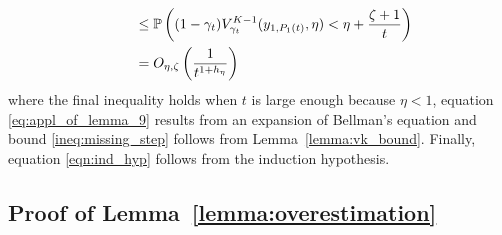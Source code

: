 \begin{myproof}[Proof.]
\begin{align}
	& \qquad \le \mathbb{P} \left(  (1-\gamma_t)V^{K-1}_{\gamma_{t}}(y_{1,P_{1}(t)}, \eta)< \eta +   \frac{\zeta + 1}{t} \right) \nonumber \\
	&\qquad =  O_{\eta,\zeta}\left(\frac{1}{t^{1 + h_\eta}}\right) \label{eqn:ind_hyp}
	\end{align}
	where the final inequality holds when $t$ is large enough because $\eta < 1$, equation \eqref{eq:appl_of_lemma_9} results from an expansion of Bellman's equation and bound \eqref{ineq:missing_step} follows from Lemma~\ref{lemma:vk_bound}. %
	Finally, equation \eqref{eqn:ind_hyp} follows from the induction hypothesis.
\end{myproof}

\subsection{Proof of Lemma~\ref{lemma:overestimation}} \label{proof:overestimation_proof}

